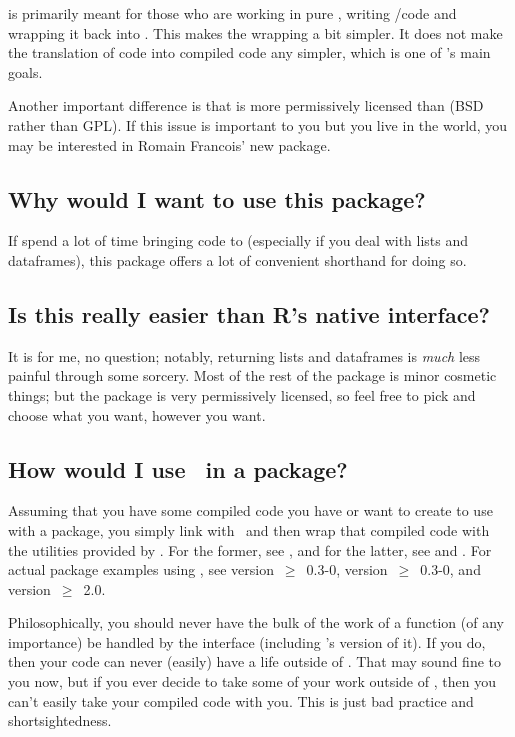 \thispackage is primarily meant for those who are working in pure \C, writing 
\C/\Fortran code and wrapping it back into \R.  This makes the wrapping a bit 
simpler.  It does not make the translation of \R code into compiled code any 
simpler, which is one of 's main goals.

Another important difference is that \thispackage is more permissively 
licensed than  (BSD rather than GPL).  If this issue is important to 
you but you live in the \Cpp world, you may be interested in Romain Francois' 
new  package.



\subsection{Why would I want to use this package?}
If spend a lot of time bringing code to \R (especially if you deal with lists 
and dataframes), this package offers a lot of convenient shorthand for doing so.



\subsection{Is this really easier than R's native interface?}
It is for me, no question; notably, returning lists and dataframes is 
\emph{much} less painful through some
\href{https://en.wikipedia.org/wiki/Stdarg.h}{}
sorcery.  Most of 
the rest of the package is minor cosmetic things; but the package is very 
permissively licensed, so feel free to pick and choose what you want, however 
you want.


\subsection{How would I use \thispackage\ in a package?}
Assuming that you have some compiled code you have or want to create to use with 
a package, you simply link with \thispackage\ and then wrap that compiled code 
with the utilities provided by \thispackage.  For the former, see 
, and for the latter, see  and 
.  For actual package examples using \thispackage, see 
\href{http://cran.r-project.org/web/packages/pbdBASE/index.html}{} 
version~$\geq$~0.3-0,  
\href{http://cran.r-project.org/web/packages/pbdDMAT/index.html}{}
version~$\geq$~0.3-0, and
\href{http://cran.r-project.org/web/packages/memuse/index.html}{}
version~$\geq$~2.0.

Philosophically, you should never have the bulk of the work of a function (of any
importance) be handled by the \R interface (including \thispackage's version of 
it). If you do, then your code can never (easily) have a life outside of \R.  
That may sound fine to you now, but if you ever decide to take some of your 
work outside of \R, then you can't easily take your compiled code with you.  
This is just bad practice and shortsightedness.  
